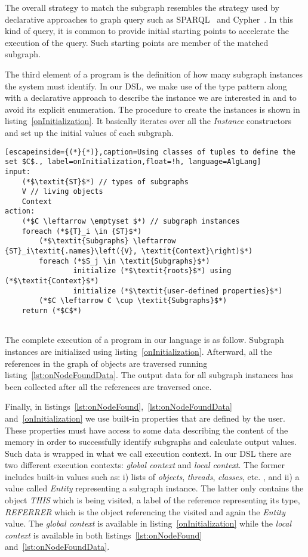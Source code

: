 The overall strategy to match the subgraph resembles the strategy used by declarative approaches to graph query such as SPARQL~\cite{Buil-Aranda:2013:FQS:2435469.2435851} and Cypher~\cite{Holzschuher:2013:PGQ:2457317.2457351}.
In this kind of query, it is common to provide initial starting points to accelerate the execution of the query. 
Such starting points are member of the matched subgraph. 

The third element of a program is the definition of how many subgraph instances the system must identify.
In our DSL, we make use of the type pattern along with a declarative approach to describe the instance we are interested in and to avoid its explicit enumeration.
The procedure to create the instances is shown in listing~\ref{onInitialization}.
It basically iterates over all the \textit{Instance} constructors and set up the initial values of each subgraph. 

\begin{lstlisting}[escapeinside={(*}{*)},caption=Using classes of tuples to define the set $C$., label=onInitialization,float=!h, language=AlgLang]
input:
	(*$\textit{ST}$*) // types of subgraphs
	V // living objects 
	Context
action:
	(*$C \leftarrow \emptyset $*) // subgraph instances
	foreach (*${T}_i \in {ST}$*)
		(*$\textit{Subgraphs} \leftarrow {ST}_i\textit{.names}\left({V}, \textit{Context}\right)$*)
		foreach (*$S_j \in \textit{Subgraphs}$*)
				initialize (*$\textit{roots}$*) using (*$\textit{Context}$*)
				initialize (*$\textit{user-defined properties}$*)
		(*$C \leftarrow C \cup \textit{Subgraphs}$*)
	return (*$C$*)
	
\end{lstlisting}

The complete execution of a program in our language is as follow. Subgraph instances are initialized using listing~\ref{onInitialization}.
Afterward, all the references in the graph of objects are traversed running listing~\ref{lst:onNodeFoundData}.
The output data for all subgraph instances has been collected after all the references are traversed once.

Finally, in listings~\ref{lst:onNodeFound},~\ref{lst:onNodeFoundData} and~\ref{onInitialization} we use built-in properties that are defined by the user.
These properties must have access to some data describing the content of the memory in order to successfully identify subgraphs and calculate output values.
Such data is wrapped in what we call execution context.
In our DSL there are two different execution contexts: \textit{global context} and \textit{local context}.
The former includes built-in values such as: i) lists of \textit{objects}, \textit{threads}, \textit{classes}, etc. , and ii) a value called \textit{Entity} representing a subgraph instance.
The latter only contains the object \textit{THIS} which is being visited, a label of the reference representing its type, \textit{REFERRER} which is the object referencing the visited and again the \textit{Entity} value.
The \textit{global context} is available in listing~\ref{onInitialization} while the \textit{local context} is available in both listings~\ref{lst:onNodeFound} and~\ref{lst:onNodeFoundData}.

